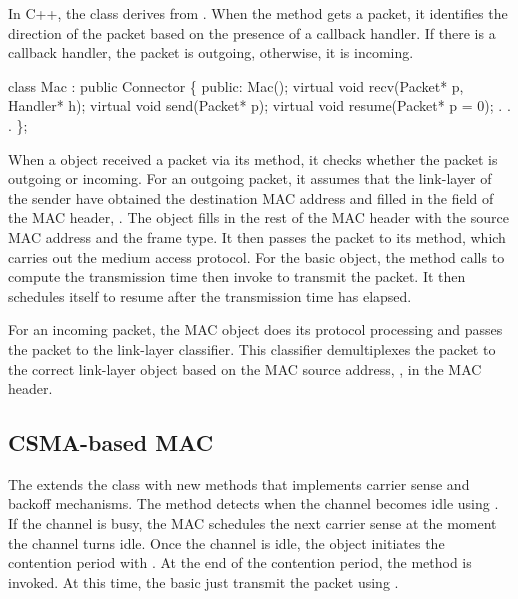 In C++, the  class derives from .  When the
 method gets a packet, it identifies the direction of the
packet based on the presence of a callback handler.  If there is a
callback handler, the packet is outgoing, otherwise, it is incoming.

\begin{program}
   class Mac : public Connector \{
   public:
        Mac();
        virtual void recv(Packet* p, Handler* h);
        virtual void send(Packet* p);
        virtual void resume(Packet* p = 0);
                . . .
    \};
\end{program}

When a  object received a packet via its  method,
it checks whether the packet is outgoing or incoming.  For an outgoing
packet, it assumes that the link-layer of the sender have obtained the
destination MAC address and filled in the  field of the
MAC header, .  The  object fills in the rest of
the MAC header with the source MAC address and the frame type.  It then
passes the packet to its  method, which carries out the
medium access protocol.  For the basic  object, the
 method calls  to compute the transmission
time then invoke  to transmit the packet.  It then
schedules itself to resume after the transmission time has elapsed.

For an incoming packet, the MAC object does its protocol processing and
passes the packet to the link-layer classifier.  This classifier
demultiplexes the packet to the correct link-layer object based on the
MAC source address, , in the MAC header.

\subsection{CSMA-based MAC}

The  extends the  class
with new methods that implements carrier sense and backoff mechanisms.
The  method detects when the channel becomes idle
using .  If the channel is busy, the MAC
schedules the next carrier sense at the moment the channel turns idle.
Once the channel is idle, the  object initiates the
contention period with .  At the end of the
contention period, the  method is invoked.  At
this time, the basic  just transmit the packet using
.

